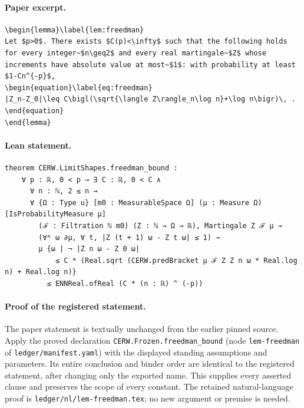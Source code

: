 \paragraph{Paper excerpt.}
\begin{verbatim}
\begin{lemma}\label{lem:freedman}
Let $p>0$. There exists $C(p)<\infty$ such that the following holds for every integer~$n\geq2$ and every real martingale~$Z$ whose increments have absolute value at most~$1$: with probability at least $1-Cn^{-p}$,
\begin{equation}\label{eq:freedman}
|Z_n-Z_0|\leq C\bigl(\sqrt{\langle Z\rangle_n\log n}+\log n\bigr)\, .
\end{equation}
\end{lemma}
\end{verbatim}
\paragraph{Lean statement.}
\begin{verbatim}
theorem CERW.LimitShapes.freedman_bound :
    ∀ p : ℝ, 0 < p → ∃ C : ℝ, 0 < C ∧
      ∀ n : ℕ, 2 ≤ n →
      ∀ {Ω : Type u} [m0 : MeasurableSpace Ω] (μ : Measure Ω) [IsProbabilityMeasure μ]
        (ℱ : Filtration ℕ m0) (Z : ℕ → Ω → ℝ), Martingale Z ℱ μ →
        (∀ᵐ ω ∂μ, ∀ t, |Z (t + 1) ω - Z t ω| ≤ 1) →
        μ {ω | ¬ |Z n ω - Z 0 ω|
            ≤ C * (Real.sqrt (CERW.predBracket μ ℱ Z Z n ω * Real.log n) + Real.log n)}
          ≤ ENNReal.ofReal (C * (n : ℝ) ^ (-p))
\end{verbatim}
\paragraph{Proof of the registered statement.}
The paper statement is textually unchanged from the earlier pinned source.
Apply the proved declaration \texttt{CERW.Frozen.freedman\_bound}
(node \texttt{lem-freedman} of \texttt{ledger/manifest.yaml}) with the displayed
standing assumptions and parameters. Its entire conclusion and binder order
are identical to the registered statement, after changing only the exported
name. This supplies every asserted clause and preserves the scope of every
constant. The retained natural-language proof is
\texttt{ledger/nl/lem-freedman.tex}; no new argument or premise is needed.
